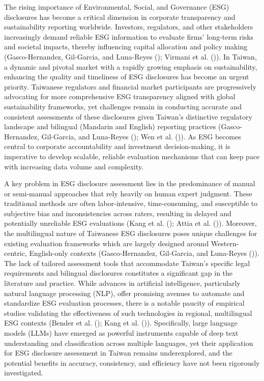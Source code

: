 \documentclass[
  12pt,
]{article}
\begin{document}
The rising importance of Environmental, Social, and Governance (ESG)
disclosures has become a critical dimension in corporate transparency
and sustainability reporting worldwide. Investors, regulators, and other
stakeholders increasingly demand reliable ESG information to evaluate
firms' long-term risks and societal impacts, thereby influencing capital
allocation and policy making (Gasco-Hernandez, Gil-Garcia, and
Luna-Reyes (); Virmani et al.
()). In Taiwan, a dynamic and pivotal
market with a rapidly growing emphasis on sustainability, enhancing the
quality and timeliness of ESG disclosures has become an urgent priority.
Taiwanese regulators and financial market participants are progressively
advocating for more comprehensive ESG transparency aligned with global
sustainability frameworks, yet challenges remain in conducting accurate
and consistent assessments of these disclosures given Taiwan's
distinctive regulatory landscape and bilingual (Mandarin and English)
reporting practices (Gasco-Hernandez, Gil-Garcia, and Luna-Reyes
(); Wen et al.
()). As ESG becomes central to corporate
accountability and investment decision-making, it is imperative to
develop scalable, reliable evaluation mechanisms that can keep pace with
increasing data volume and complexity.

A key problem in ESG disclosure assessment lies in the predominance of
manual or semi-manual approaches that rely heavily on human expert
judgment. These traditional methods are often labor-intensive,
time-consuming, and susceptible to subjective bias and inconsistencies
across raters, resulting in delayed and potentially unreliable ESG
evaluations (Kang et al. (); Attia et al.
()). Moreover, the multilingual nature of
Taiwanese ESG disclosures poses unique challenges for existing
evaluation frameworks which are largely designed around Western-centric,
English-only contexts (Gasco-Hernandez, Gil-Garcia, and Luna-Reyes
()). The lack of tailored
assessment tools that accommodate Taiwan's specific legal requirements
and bilingual disclosures constitutes a significant gap in the
literature and practice. While advances in artificial intelligence,
particularly natural language processing (NLP), offer promising avenues
to automate and standardize ESG evaluation processes, there is a notable
paucity of empirical studies validating the effectiveness of such
technologies in regional, multilingual ESG contexts (Bender et al.
(); Kang et al.
()). Specifically, large language models
(LLMs) have emerged as powerful instruments capable of deep text
understanding and classification across multiple languages, yet their
application for ESG disclosure assessment in Taiwan remains
underexplored, and the potential benefits in accuracy, consistency, and
efficiency have not been rigorously investigated.
\end{document}
